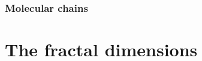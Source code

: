 \documentclass[11pt]{article}
\begin{document}
\subsubsection{Molecular chains}

\section{The fractal dimensions}

{}

\end{document}
